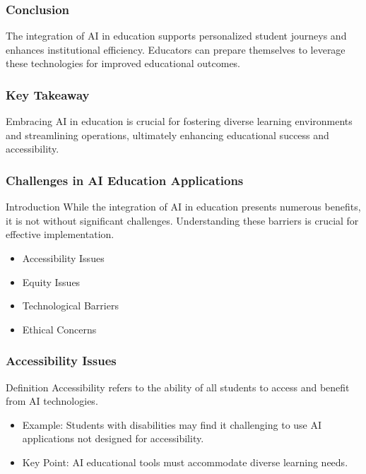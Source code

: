 \documentclass[aspectratio=169]{beamer}
\begin{document}
\begin{frame}[fragile]
    \frametitle{Conclusion}
    The integration of AI in education supports personalized student journeys and enhances institutional efficiency. Educators can prepare themselves to leverage these technologies for improved educational outcomes.
\end{frame}

\begin{frame}[fragile]
    \frametitle{Key Takeaway}
    Embracing AI in education is crucial for fostering diverse learning environments and streamlining operations, ultimately enhancing educational success and accessibility.
\end{frame}

\begin{frame}[fragile]
  \frametitle{Challenges in AI Education Applications}
  
  \begin{block}{Introduction}
  While the integration of AI in education presents numerous benefits, it is not without significant challenges. Understanding these barriers is crucial for effective implementation.
  \end{block}
  
  \begin{itemize}
    \item Accessibility Issues
    \item Equity Issues
    \item Technological Barriers
    \item Ethical Concerns
  \end{itemize}
  
\end{frame}

\begin{frame}[fragile]
  \frametitle{Accessibility Issues}
  
  \begin{block}{Definition}
  Accessibility refers to the ability of all students to access and benefit from AI technologies.
  \end{block}
  
  \begin{itemize}
    \item Example: Students with disabilities may find it challenging to use AI applications not designed for accessibility.
    \item Key Point: AI educational tools must accommodate diverse learning needs.
  \end{itemize}
  
\end{frame}
\end{document}
